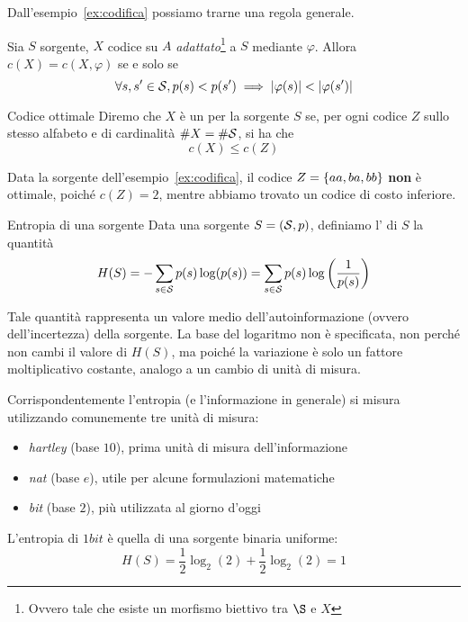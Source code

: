 Dall'esempio~\ref{ex:codifica} possiamo trarne una regola generale.

\begin{proposition}{}
  Sia \(S\) sorgente, \(X\) codice su \(A\) \emph{adattato}\footnote{Ovvero tale che esiste un morfismo biettivo tra \(\S\) e \(X\)} a \(S\) mediante \(\varphi\).
  Allora \(c(X) = c(X,\varphi)\) se e solo se
    \[\forall s,s' \in \mathcal{S}, p(s) < p(s') \implies \left|\varphi(s)\right| < \left|\varphi(s')\right| \]
\end{proposition}

\begin{definition}{Codice ottimale}
  Diremo che \(X\) è un  per la sorgente \(S\) se, per ogni codice \(Z\) sullo stesso alfabeto e di cardinalità \(\# X = \# \mathcal{S}\), si ha che
  \[c(X) \leq c(Z)\]
\end{definition}

\begin{example}{}
  Data la sorgente dell'esempio~\ref{ex:codifica}, il codice \(Z = \set{aa,ba,bb}\) \textbf{non} è ottimale, poiché \(c(Z) = 2\), mentre abbiamo trovato un codice di costo inferiore.
\end{example}

\begin{definition}{Entropia di una sorgente}
  Data una sorgente \(S = (\mathcal{S},p)\), definiamo l' di \(S\) la quantità
  \[H(S) = -\sum_{s \in \mathcal{S}} p(s) \log(p(s)) = \sum_{s \in \mathcal{S}} p(s) \log\left(\frac{1}{p(s)}\right)\]  
\end{definition}

Tale quantità rappresenta un valore medio dell'autoinformazione (ovvero dell'incertezza) della sorgente.
La base del logaritmo non è specificata, non perché non cambi il valore di \(H(S)\), ma poiché la variazione è solo un fattore moltiplicativo costante, analogo a un cambio di unità di misura.

Corrispondentemente l'entropia (e l'informazione in generale) si misura utilizzando comunemente tre unità di misura:
\begin{itemize}
  \item \emph{hartley} (base \(10\)), prima unità di misura dell'informazione
  \item \emph{nat} (base \(e\)), utile per alcune formulazioni matematiche
  \item \emph{bit} (base \(2\)), più utilizzata al giorno d'oggi
\end{itemize}
L'entropia di \(1 bit\) è quella di una sorgente binaria uniforme:
\[H(S) = \frac{1}{2}\log_2(2) + \frac{1}{2}\log_2(2) = 1\]

